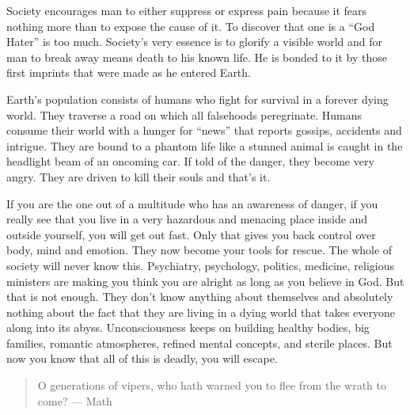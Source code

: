 \documentclass[12pt,letterpaper]{article}
\begin{document}
Society encourages man to either suppress or express pain because it
fears nothing more than to expose the cause of it. To discover that
one is a ``God Hater'' is too much. Society's very essence is to
glorify a visible world and for man to break away means death to his
known life. He is bonded to it by those first imprints that were made
as he entered Earth.

Earth's population consists of humans who fight for survival in a
forever dying world. They traverse a road on which all falsehoods
peregrinate. Humans consume their world with a hunger for ``news'' that
reports gossips, accidents and intrigue. They are bound to a phantom
life like a stunned animal is caught in the headlight beam of an
oncoming car. If told of the danger, they become very angry. They are
driven to kill their souls and that's it.

If you are the one out of a multitude who has an awareness of danger,
if you really see that you live in a very hazardous and menacing
place inside and outside yourself, you will get out fast. Only that
gives you back control over body, mind and emotion. They now become
your tools for rescue. The whole of society will never know
this. Psychiatry, psychology, politics, medicine, religious ministers
are making you think you are alright as long as you believe in
God. But that is not
 enough. They don't know anything about
themselves and absolutely nothing about the fact that they are living
in a dying world that takes everyone along into its
abyss. Unconsciousness keeps on building healthy bodies, big families,
romantic atmospheres, refined mental concepts, and sterile places. But
now you know that all of this is deadly, you will escape.

\begin{quotation} O generations of vipers, who hath warned you to flee
from the wrath to come?  --- Math
\end{quotation}
\end{document}
